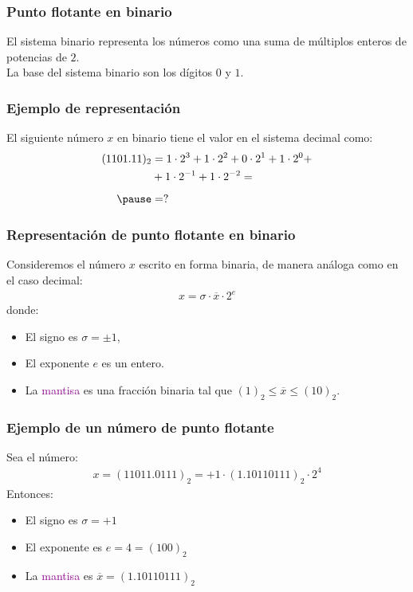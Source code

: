 \documentclass[12pt]{beamer}
\begin{document}
\begin{frame}
\frametitle{Punto flotante en binario}
El sistema binario representa los números como una suma de múltiplos enteros de potencias de $2$.
\\
\bigskip
\pause
La base del sistema binario son los dígitos $0$ y $1$.
\end{frame}
\begin{frame}
\frametitle{Ejemplo de representación}
El siguiente número $x$ en binario tiene el valor en el sistema decimal como:
\pause
\begin{eqnarray*}
\begin{aligned}
(1101.11)_{2} &= 1 \cdot 2^{3} + 1 \cdot 2^{2} + 0 \cdot 2^{1} + 1 \cdot 2^{0} + \\
 &+ 1 \cdot 2^{-1} + 1 \cdot 2^{-2} = \\[0.5em] \pause
 &= ?
\end{aligned}
\end{eqnarray*}
\end{frame}
\begin{frame}
\frametitle{Representación de punto flotante en binario}
Consideremos el número $x$ escrito en forma binaria, de manera análoga como en el caso decimal:
\pause
\begin{align*}
x =  \sigma \cdot \overline{x} \cdot 2^{e}
\end{align*}
\pause
donde: 
\begin{itemize}[<+->]
\item[\ding{212}] El \textcolor{lava}{signo} es $\sigma= \pm 1$,
\item[\ding{212}] El \textcolor{cadmiumgreen}{exponente} $e$ es un entero.
\item[\ding{212}] La \textcolor{darkmagenta}{mantisa} es una fracción binaria tal que $ (1)_{2} \leq \overline{x} \leq (10)_{2}$.
\end{itemize}
\end{frame}
\begin{frame}
\frametitle{Ejemplo de un número de punto flotante}
Sea el número:
\pause
\begin{align*}
x = (11011.0111)_{2} = +1 \cdot (1.10110111)_{2} \cdot 2^{4}
\end{align*}
\pause
Entonces:
\pause
\begin{itemize}[<+->]
\item[\ding{212}] El \textcolor{lava}{signo} es $\sigma = +1$
\item[\ding{212}] El \textcolor{cadmiumgreen}{exponente} es $e = 4 = (100)_{2}$
\item[\ding{212}] La \textcolor{darkmagenta}{mantisa} es $\overline{x} = (1.10110111)_{2}$
\end{itemize}
\end{frame}
\end{document}
